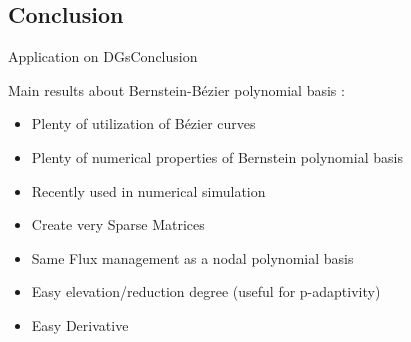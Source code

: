 \documentclass[10pt]{beamer}
\begin{document}
\subsection{Conclusion}
\begin{frame}{Application on DGs}{Conclusion}

  Main results about Bernstein-Bézier polynomial basis :
  \begin{itemize}
  \item Plenty of utilization of Bézier curves
  \item Plenty of numerical properties of Bernstein polynomial basis
  \item Recently used in numerical simulation
  \item Create very Sparse Matrices
  \item Same Flux management as a nodal polynomial basis
  \item Easy elevation/reduction degree (useful for p-adaptivity)
  \item Easy Derivative
  \end{itemize}


\end{frame}

\end{document}

